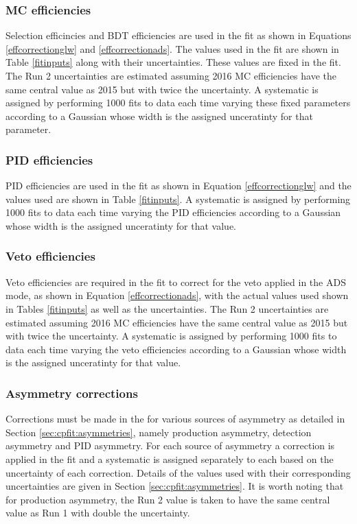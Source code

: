 \subsubsection{MC efficiencies}

Selection efficincies and BDT efficiencies are used in the \CP fit as shown in Equations \ref{effcorrectionglw} and \ref{effcorrectionads}. The values used in the \CP fit are shown in Table \ref{fitinputs} along with their uncertainties. These values are fixed in the \CP fit. The Run 2 uncertainties are estimated assuming 2016 MC efficiencies have the same central value as 2015 but with twice the uncertainty.  A systematic is assigned by performing 1000 fits to data each time varying these fixed parameters according to a Gaussian whose width is the assigned unceratinty for that parameter.

\subsubsection{PID efficiencies}

PID efficiencies are used in the \CP fit as shown in Equation \ref{effcorrectionglw} and the values used are shown in Table \ref{fitinputs}. A systematic is assigned by performing 1000 fits to data each time varying the PID efficiencies according to a Gaussian whose width is the assigned unceratinty for that value.

\subsubsection{Veto efficiencies}

Veto efficiencies are required in the \CP fit to correct for the veto applied in the ADS mode, as shown in Equation \ref{effcorrectionads}, with the actual values used shown in Tables \ref{fitinputs} as well as the uncertainties. The Run 2 uncertainties are estimated assuming 2016 MC efficiencies have the same central value as 2015 but with twice the uncertainty. A systematic is assigned by performing 1000 fits to data each time varying the veto efficiencies according to a Gaussian whose width is the assigned unceratinty for that value.

\subsubsection{Asymmetry corrections}

Corrections must be made in the \CP for various sources of asymmetry as detailed in Section \ref{sec:cpfit:asymmetries}, namely production asymmetry, detection asymmetry and PID asymmetry. For each source of asymmetry a correction is applied in the \CP fit and a systematic is assigned separately to each based on the uncertainty of each correction. Details of the values used with their corresponding uncertainties are given in Section \ref{sec:cpfit:asymmetries}. It is worth noting that for production asymmetry, the Run 2 value is taken to have the same central value as Run 1 with double the uncertainty. 


